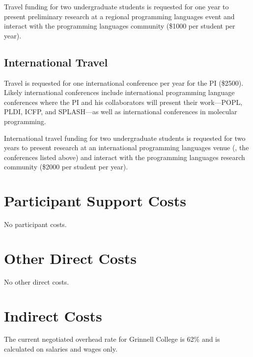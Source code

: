 \documentclass[11pt]{article}
\begin{document}
Travel funding for two undergraduate students is requested for one year to present preliminary research at a regional programming languages event and interact with the programming languages community (\$1000 per student per year).

\subsection{International Travel}

Travel is requested for one international conference per year for the PI (\$2500).
Likely international conferences include international programming language conferences where the PI and his collaborators will present their work---POPL, PLDI, ICFP, and SPLASH---as well as international conferences in molecular programming.

International travel funding for two undergraduate students is requested for two years to present research at an international programming languages venue (\eg, the conferences listed above) and interact with the programming languages research community (\$2000 per student per year).

\section{Participant Support Costs}

No participant costs.

\section{Other Direct Costs}

No other direct costs.

\section{Indirect Costs}

The current negotiated overhead rate for Grinnell College is 62\% and is calculated on salaries and wages only.
\end{document}
